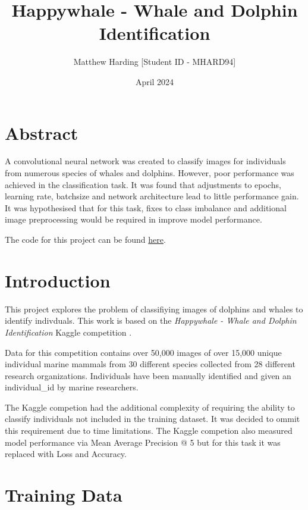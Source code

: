 \documentclass{article}
\title{Happywhale - Whale and Dolphin Identification}
\author{Matthew Harding [Student ID - MHARD94]}
\date{April 2024}
\begin{document}
\maketitle

\section{Abstract}
A convolutional neural network was created to classify images for individuals from numerous species of whales and dolphins. However, poor performance was achieved in the classification task.
It was found that adjustments to epochs, learning rate, batchsize and network architecture lead to little performance gain. It was hypothesised that for this task, fixes to class imbalance and additional image preprocessing would 
be required in improve model performance.

The code for this project can be found \href{https://github.com/matt-harding/AMLS_II_assignment23_24}{here}.

\section{Introduction}
This project explores the problem of classifiying images of dolphins and whales to identify indivduals. This work 
is based on the \emph{Happywhale - Whale and Dolphin Identification} Kaggle competition \cite{kaggle_comp}.

Data for this competition contains over 50,000 images of over 15,000 unique individual marine mammals from 30 different species collected from 28 different research organizations. 
Individuals have been manually identified and given an individual\_id by marine researchers.

The Kaggle competion had the additional complexity of requiring the ability to classify individuals not included in the training dataset. It was decided to ommit this requirement due to time limitations. The Kaggle competion also measured model performance via Mean Average Precision @ 5 but for this task it was replaced with Loss and Accuracy.

\section{Training Data}
\end{document}
